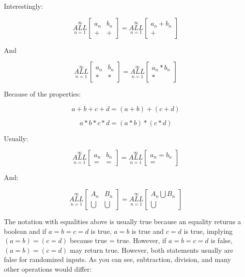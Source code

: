 \documentclass{article}
\begin{document}
Interestingly:

$$\underset{n=1}{\overset{\infty}{ALL}} \begin{bmatrix}
a_n & b_n \\
+& +
\end{bmatrix} = \underset{n=1}{\overset{\infty}{ALL}} \begin{bmatrix}
a_n + b_n \\
 +
\end{bmatrix}$$

And

$$\underset{n=1}{\overset{\infty}{ALL}} \begin{bmatrix}
a_n & b_n \\
*& *
\end{bmatrix} = \underset{n=1}{\overset{\infty}{ALL}} \begin{bmatrix}
a_n * b_n \\
 *
\end{bmatrix}$$

Because of the properties:

$$a+b+c+d=(a+b)+(c+d)$$

$$a*b*c*d=(a*b)*(c*d)$$

Usually:

$$\underset{n=1}{\overset{\infty}{ALL}} \begin{bmatrix}
a_n & b_n \\
=& =
\end{bmatrix} = \underset{n=1}{\overset{\infty}{ALL}} \begin{bmatrix}
a_n = b_n \\
 =
\end{bmatrix}$$

And:

$$\underset{n=1}{\overset{\infty}{ALL}} \begin{bmatrix}
A_n & B_n \\
\bigcup & \bigcup
\end{bmatrix} = \underset{n=1}{\overset{\infty}{ALL}} \begin{bmatrix}
A_n \bigcup B_n \\
 \bigcup
\end{bmatrix}$$

The notation with equalities above is usually true because an equality returns a boolean and if $a=b=c=d$ is true, $a=b$ is true and $c=d$ is true, implying $(a=b)=(c=d)$ because true = true. However, if $a=b=c=d$ is false, $(a=b)=(c=d)$ may return true. However, both statements usually are false for randomized inputs. As you can see, subtraction, division, and many other operations would differ:
\end{document}
